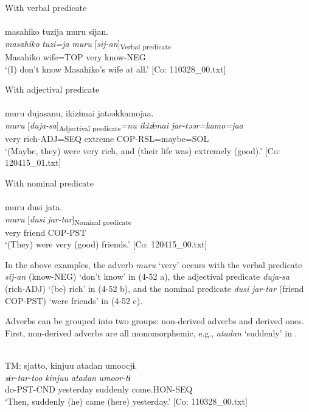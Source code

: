 \ea  \ea With verbal predicate \label{ex:4.52}\\\\
\glll    masahiko  tuzija  muru  sijan.\\
    \textit{masahiko}  \textit{tuzi=ja}  \textit{muru}  [\textit{sij-an}]\textsubscript{Verbal predicate}\\
    Masahiko  wife=TOP  very  know-NEG\\
    \glt     ‘(I) don’t know Masahiko’s wife at all.’ [Co: 110328\_00.txt]

  \ex With adjectival predicate\\\\
\glll    muru  dujasanu,  ikizɨmai  jatəəkkamojaa.\\
    \textit{muru}  [\textit{duja-sa}]\textsubscript{Adjectival predicate}\textit{=nu}  \textit{ikizɨmai}  \textit{jar-təər=kamo=jaa}\\
    very  rich-ADJ=SEQ  extreme  COP-RSL=maybe=SOL\\
    \glt     ‘(Maybe, they) were very rich, and (their life was) extremely (good).’ [Co: 120415\_01.txt]

\ex With nominal predicate\\\\
\glll  muru  dusi  jata.\\
    \textit{muru}  [\textit{dusi}  \textit{jar-tar}]\textsubscript{Nominal predicate}\\
    very  friend  COP-PST\\
    \glt     ‘(They) were very (good) friends.’ [Co: 120415\_00.txt]
    \z
\z

In the above examples, the adverb \textit{muru} ‘very’ occurs with the verbal predicate \textit{sij-an} (know-NEG) ‘don’t know’ in (4-52 a), the adjectival predicate \textit{duja-sa} (rich-ADJ) ‘(be) rich’ in (4-52 b), and the nominal predicate \textit{dusi} \textit{jar-tar} (friend COP-PST) ‘were friends’ in (4-52 c).

  Adverbs can be grouped into two groups: non-derived adverbs and derived ones. First, non-derived adverbs are all monomorphemic, e.g., \textit{atadan} ‘suddenly’ in .

\ea{} \label{ex:4.53}\\
\glll  TM:  sjatto,  kinjuu  atadan  umoocjɨ.\\
    \textit{sɨr-tar-too}  \textit{kinjuu}  \textit{atadan}  \textit{umoor-tɨ}\\
    do-PST-CND  yesterday  suddenly  come.HON-SEQ\\
  \glt     ‘Then, suddenly (he) came (here) yesterday.’ [Co: 110328\_00.txt]
\z


